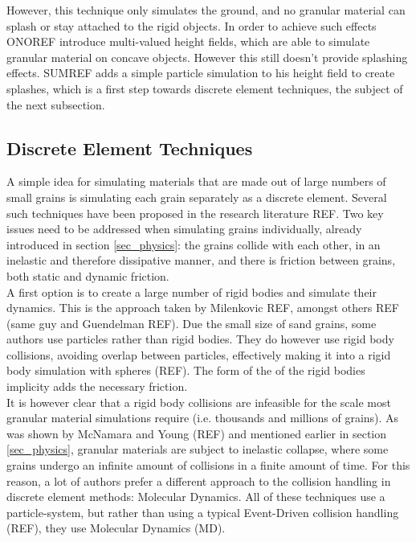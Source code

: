 However, this technique only simulates the ground, and no granular material can splash or stay attached to the rigid objects. In order to achieve such effects ONOREF introduce multi-valued height fields, which are able to simulate granular material on concave objects. However this still doesn't provide splashing effects. SUMREF adds a simple particle simulation to his height field to create splashes, which is a first step towards discrete element techniques, the subject of the next subsection.


\subsection{Discrete Element Techniques}
A simple idea for simulating materials that are made out of large numbers of small grains is simulating each grain separately as a discrete element. Several such techniques have been proposed in the research literature REF. Two key issues need to be addressed when simulating grains individually, already introduced in section \ref{sec_physics}: the grains collide with each other, in an inelastic and therefore dissipative manner, and there is friction between grains, both static and dynamic friction.\\

A first option is to create a large number of rigid bodies and simulate their dynamics. This is the approach taken by Milenkovic REF, amongst others REF (same guy and Guendelman REF). Due the small size of sand grains, some authors use particles rather than rigid bodies. They do however use rigid body collisions, avoiding overlap between particles, effectively making it into a rigid body simulation with spheres (REF). The form of the of the rigid bodies implicity adds the necessary friction.\\

It is however clear that a rigid body collisions are infeasible for the scale most granular material simulations require (i.e. thousands and millions of grains). As was shown by McNamara and Young (REF) and mentioned earlier in section \ref{sec_physics}, granular materials are subject to inelastic collapse, where some grains undergo an infinite amount of collisions in a finite amount of time. For this reason, a lot of authors prefer a different approach to the collision handling in discrete element methods: Molecular Dynamics. All of these techniques use a particle-system, but rather than using a typical Event-Driven collision handling (REF), they use Molecular Dynamics (MD). \\

